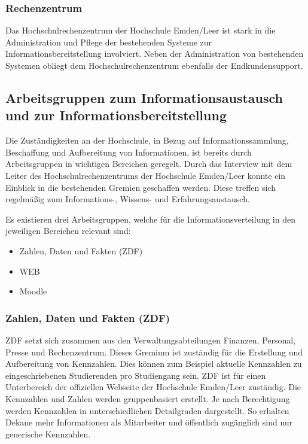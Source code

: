 \subsubsection{Rechenzentrum}
Das Hochschulrechenzentrum der Hochschule Emden/Leer ist stark in die Administration und Pflege der bestehenden Systeme zur Informationsbereitstellung involviert. Neben der Administration von bestehenden Systemen obliegt dem Hochschulrechenzentrum ebenfalls der Endkundensupport.

\subsection{Arbeitsgruppen zum Informationsaustausch und zur Informationsbereitstellung}
\label{subsection_arbeitsgruppen_informationsaustausch}
Die Zuständigkeiten an der Hochschule, in Bezug auf Informationssammlung, Beschaffung und Aufbereitung von Informationen, ist bereits durch Arbeitsgruppen in wichtigen Bereichen geregelt. Durch das Interview mit dem Leiter des Hochschulrechenzentrums der Hochschule Emden/Leer konnte ein Einblick in die bestehenden Gremien geschaffen werden. Diese treffen sich regelmäßig zum Informations-, Wissens- und Erfahrungsaustausch.

Es existieren drei Arbeitsgruppen, welche für die Informationsverteilung in den jeweiligen Bereichen relevant sind:

\begin{itemize}
	\item Zahlen, Daten und Fakten (ZDF)
	\item WEB
	\item Moodle
\end{itemize}

\subsubsection{Zahlen, Daten und Fakten (ZDF)}
ZDF setzt sich zusammen aus den Verwaltungsabteilungen Finanzen, Personal, Presse und Rechenzentrum. Dieses Gremium ist zuständig für die Erstellung und Aufbereitung von Kennzahlen. Dies können zum Beispiel aktuelle Kennzahlen zu eingeschriebenen Studierenden pro Studiengang sein.  ZDF ist für einen Unterbereich der offiziellen Webseite der Hochschule Emden/Leer zuständig. Die Kennzahlen und Zahlen werden gruppenbasiert erstellt. Je nach Berechtigung werden Kennzahlen in unterschiedlichen Detailgraden dargestellt. So erhalten Dekane mehr Informationen als Mitarbeiter und öffentlich zugänglich sind nur generische Kennzahlen. 

